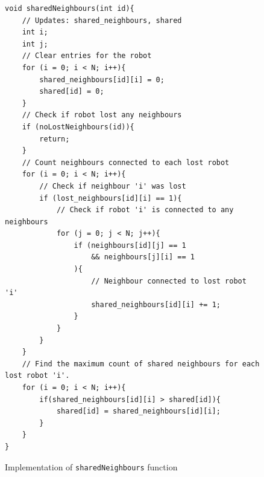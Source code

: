 \begin{figure}[H]
\caption{Implementation of \texttt{sharedNeighbours} function}
\begin{lstlisting}[style=C++]
void sharedNeighbours(int id){
    // Updates: shared_neighbours, shared
    int i;
    int j; 
    // Clear entries for the robot
    for (i = 0; i < N; i++){
        shared_neighbours[id][i] = 0;
        shared[id] = 0;
    }
    // Check if robot lost any neighbours
    if (noLostNeighbours(id)){
        return;
    }
    // Count neighbours connected to each lost robot 
    for (i = 0; i < N; i++){
        // Check if neighbour 'i' was lost
        if (lost_neighbours[id][i] == 1){
            // Check if robot 'i' is connected to any neighbours
            for (j = 0; j < N; j++){
                if (neighbours[id][j] == 1 
                    && neighbours[j][i] == 1
                ){
                    // Neighbour connected to lost robot 'i'
                    shared_neighbours[id][i] += 1;
                }
            }
        }
    }
    // Find the maximum count of shared neighbours for each lost robot 'i'.
    for (i = 0; i < N; i++){
        if(shared_neighbours[id][i] > shared[id]){
            shared[id] = shared_neighbours[id][i];
        }
    }
}
\end{lstlisting}
\label{fig:update_1}
\end{figure}